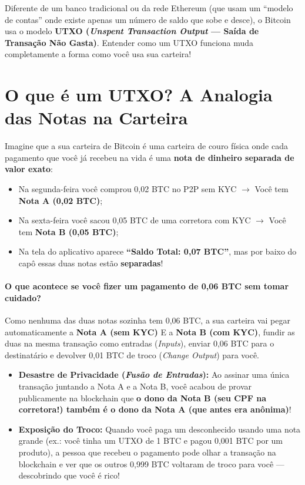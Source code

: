 \documentclass{pousadaguide}
\begin{document}
Diferente de um banco tradicional ou da rede Ethereum (que usam um ``modelo de contas'' onde existe apenas um número de saldo que sobe e desce), o Bitcoin usa o modelo \textbf{UTXO (\emph{Unspent Transaction Output} — Saída de Transação Não Gasta)}. Entender como um UTXO funciona muda completamente a forma como você usa sua carteira!

\section{O que é um UTXO? A Analogia das Notas na Carteira}

Imagine que a sua carteira de Bitcoin é uma carteira de couro física onde cada pagamento que você já recebeu na vida é uma \textbf{nota de dinheiro separada de valor exato}:
\begin{itemize}
  \item Na segunda-feira você comprou 0,02 BTC no P2P sem KYC $\to$ Você tem \textbf{Nota A (0,02 BTC)};
  \item Na sexta-feira você sacou 0,05 BTC de uma corretora com KYC $\to$ Você tem \textbf{Nota B (0,05 BTC)};
  \item Na tela do aplicativo aparece \textbf{``Saldo Total: 0,07 BTC''}, mas por baixo do capô essas duas notas estão \textbf{separadas}!
\end{itemize}

\paragraph{O que acontece se você fizer um pagamento de 0,06 BTC sem tomar cuidado?}
Como nenhuma das duas notas sozinha tem 0,06 BTC, a sua carteira vai pegar automaticamente a \textbf{Nota A (sem KYC)} E a \textbf{Nota B (com KYC)}, fundir as duas na mesma transação como entradas (\emph{Inputs}), enviar 0,06 BTC para o destinatário e devolver 0,01 BTC de troco (\emph{Change Output}) para você.
\begin{itemize}
  \item \textbf{Desastre de Privacidade (\emph{Fusão de Entradas}):} Ao assinar uma única transação juntando a Nota A e a Nota B, você acabou de provar publicamente na blockchain que \textbf{o dono da Nota B (seu CPF na corretora!) também é o dono da Nota A (que antes era anônima)}!
  \item \textbf{Exposição do Troco:} Quando você paga um desconhecido usando uma nota grande (ex.: você tinha um UTXO de 1 BTC e pagou 0,001 BTC por um produto), a pessoa que recebeu o pagamento pode olhar a transação na blockchain e ver que os outros 0,999 BTC voltaram de troco para você — descobrindo que você é rico!
\end{itemize}
\end{document}
